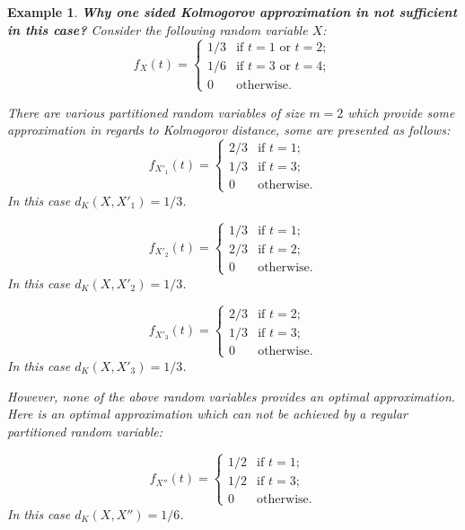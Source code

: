 \documentclass{article}
\newtheorem{example}[thm]{Example}
\begin{document}
\begin{example}\textbf{Why one sided Kolmogorov approximation in not sufficient in this case?}
	Consider the following random variable $X$: 
	$$
	f_{X}(t) = \begin{cases}
	1/3           & \text{if $t=1$ or $t=2$} ;  \\ 
	1/6           & \text{if $t=3$ or $t=4$};  \\  
	0             & \text{otherwise.}
	\end{cases}
	$$
	
	There are various partitioned random variables of size $m=2$ which provide some approximation in regards to Kolmogorov distance, some are presented as follows:
	$$
	f_{X'_1}(t) = \begin{cases}
	2/3           & \text{if } t=1;  \\ 
	1/3           & \text{if } t=3;  \\  
	0             & \text{otherwise.}
	\end{cases}
	$$
	In this case $d_K(X, X'_1) = 1/3$.
	
	$$
	f_{X'_2}(t) = \begin{cases}
	1/3           & \text{if } t=1;  \\ 
	2/3           & \text{if } t=2;  \\  
	0             & \text{otherwise.}
	\end{cases}
	$$
	In this case $d_K(X, X'_2) = 1/3$.
	
	$$
	f_{X'_3}(t) = \begin{cases}
	2/3           & \text{if } t=2;  \\ 
	1/3           & \text{if } t=3;  \\  
	0             & \text{otherwise.}
	\end{cases}
	$$
	In this case $d_K(X, X'_3) = 1/3$.
	
	However, none of the above random variables provides an optimal approximation. Here is an optimal approximation which can not be achieved by a regular partitioned random variable:
	
	$$ 	f_{X''}(t) = \begin{cases}
	1/2           & \text{if } t=1;  \\ 
	1/2           & \text{if } t=3;  \\  
	0             & \text{otherwise.}
	\end{cases}
	$$
	In this case $d_K(X, X'') = 1/6$.
\end{example}
\end{document}
